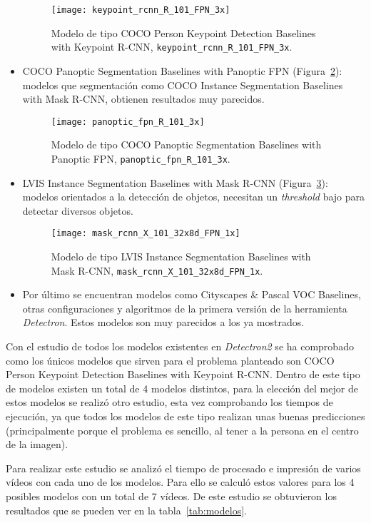 \begin{itemize}
	\begin{figure}[h]
		\centering
		\texttt{[image: keypoint\_rcnn\_R\_101\_FPN\_3x]}
		\caption{Modelo de tipo COCO Person Keypoint Detection Baselines with Keypoint R-CNN, \texttt{keypoint\_rcnn\_R\_101\_FPN\_3x}.}
		\label{fig:keypoint_rcnn_R_101_FPN_3x}
	\end{figure}
	\item COCO Panoptic Segmentation Baselines with Panoptic FPN (Figura~\ref{fig:panoptic_fpn_R_101_3x}): modelos que segmentación como COCO Instance Segmentation Baselines with Mask R-CNN, obtienen resultados muy parecidos.
	\begin{figure}[h]
		\centering
		\texttt{[image: panoptic\_fpn\_R\_101\_3x]}
		\caption{Modelo de tipo COCO Panoptic Segmentation Baselines with Panoptic FPN, \texttt{panoptic\_fpn\_R\_101\_3x}.}
		\label{fig:panoptic_fpn_R_101_3x}
	\end{figure}
	\item LVIS Instance Segmentation Baselines with Mask R-CNN (Figura~\ref{fig:mask_rcnn_X_101_32x8d_FPN_1x}): modelos orientados a la detección de objetos, necesitan un \textit{threshold} bajo para detectar diversos objetos.
	\begin{figure}[h]
		\centering
		\texttt{[image: mask\_rcnn\_X\_101\_32x8d\_FPN\_1x]}
		\caption{Modelo de tipo LVIS Instance Segmentation Baselines with Mask R-CNN, \texttt{mask\_rcnn\_X\_101\_32x8d\_FPN\_1x}.}
		\label{fig:mask_rcnn_X_101_32x8d_FPN_1x}
	\end{figure}
	\item Por último se encuentran modelos como Cityscapes \& Pascal VOC Baselines, otras configuraciones y algoritmos de la primera versión de la herramienta \textit{Detectron}. Estos modelos son muy parecidos a los ya mostrados.
\end{itemize}

Con el estudio de todos los modelos existentes en \textit{Detectron2} se ha comprobado como los únicos modelos que sirven para el problema planteado son COCO Person Keypoint Detection Baselines with Keypoint R-CNN. Dentro de este tipo de modelos existen un total de 4 modelos distintos, para la elección del mejor de estos modelos se realizó otro estudio, esta vez comprobando los tiempos de ejecución, ya que todos los modelos de este tipo realizan unas buenas predicciones (principalmente porque el problema es sencillo, al tener a la persona en el centro de la imagen).

Para realizar este estudio se analizó el tiempo de procesado e impresión de varios vídeos con cada uno de los modelos. Para ello se calculó estos valores para los 4 posibles modelos con un total de 7 vídeos. De este estudio se obtuvieron los resultados que se pueden ver en la tabla~\ref{tab:modelos}.

